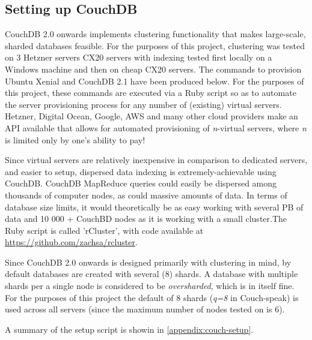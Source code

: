 \subsection{Setting up CouchDB}
CouchDB 2.0 onwards implements clustering functionality that makes large-scale, sharded databases feasible. For the purposes of this project, clustering was tested on 3 Hetzner servers CX20 servers with indexing tested first locally on a Windows machine and then on cheap CX20 servers. The commands to provision Ubuntu Xenial and CouchDB 2.1 have been produced below. For the purposes of this project, these commands are executed via a Ruby script so as to automate the server provisioning process for any number of (existing) virtual servers. Hetzner, Digital Ocean, Google, AWS and many other cloud providers make an API available that allows for automated provisioning of \textit{n}-virtual servers, where \textit{n} is limited only by one's ability to pay!

Since virtual servers are relatively inexpensive in comparison to dedicated servers, and easier to setup, dispersed data indexing is extremely-achievable using CouchDB. CouchDB MapReduce queries could easily be dispersed among thousands of computer nodes, as could massive amounts of data. In terms of database size limits, it would theoretically be as easy working with several PB of data and 10 000 + CouchBD nodes as it is working with a small cluster.The Ruby script is called 'rCluster', with code available at \url{https://github.com/zachsa/rcluster}.

Since CouchDB 2.0 onwards is designed primarily with clustering in mind, by default databases are created with several (8) shards. A database with multiple shards per a single node is considered to be \textit{oversharded}, which is in itself fine. For the purposes of this project the default of 8 shards (\textit{q=8} in Couch-speak) is used across all servers (since the maximum number of nodes tested on is 6).

A summary of the setup script is showin in \ref{appendix:couch-setup}.